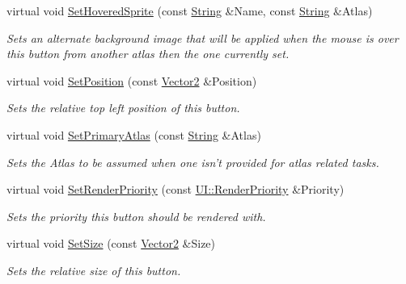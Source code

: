 \begin{DoxyCompactItemize}
virtual void \hyperlink{classMezzanine_1_1UI_1_1Button_ae47110a04c883f83a30e7bc060a35692}{SetHoveredSprite} (const \hyperlink{namespaceMezzanine_acf9fcc130e6ebf08e3d8491aebcf1c86}{String} \&Name, const \hyperlink{namespaceMezzanine_acf9fcc130e6ebf08e3d8491aebcf1c86}{String} \&Atlas)
\begin{DoxyCompactList}\small\item\em Sets an alternate background image that will be applied when the mouse is over this button from another atlas then the one currently set. \item\end{DoxyCompactList}\item 
virtual void \hyperlink{classMezzanine_1_1UI_1_1Button_aff2d96a45c88627098ac0b902059bfc3}{SetPosition} (const \hyperlink{classMezzanine_1_1Vector2}{Vector2} \&Position)
\begin{DoxyCompactList}\small\item\em Sets the relative top left position of this button. \item\end{DoxyCompactList}\item 
virtual void \hyperlink{classMezzanine_1_1UI_1_1Button_af1248af0bf094b29f65547b1697c3c23}{SetPrimaryAtlas} (const \hyperlink{namespaceMezzanine_acf9fcc130e6ebf08e3d8491aebcf1c86}{String} \&Atlas)
\begin{DoxyCompactList}\small\item\em Sets the Atlas to be assumed when one isn't provided for atlas related tasks. \item\end{DoxyCompactList}\item 
virtual void \hyperlink{classMezzanine_1_1UI_1_1Button_aebb9eb3fc42b2f6e77fe0a213c297450}{SetRenderPriority} (const \hyperlink{namespaceMezzanine_1_1UI_ac4c753eb6b5d66350a243acc9ce54130}{UI::RenderPriority} \&Priority)
\begin{DoxyCompactList}\small\item\em Sets the priority this button should be rendered with. \item\end{DoxyCompactList}\item 
virtual void \hyperlink{classMezzanine_1_1UI_1_1Button_a2a654b05e925924d5842f36b2a486af5}{SetSize} (const \hyperlink{classMezzanine_1_1Vector2}{Vector2} \&Size)
\begin{DoxyCompactList}\small\item\em Sets the relative size of this button. \item\end{DoxyCompactList}\item 

\end{DoxyCompactItemize}

